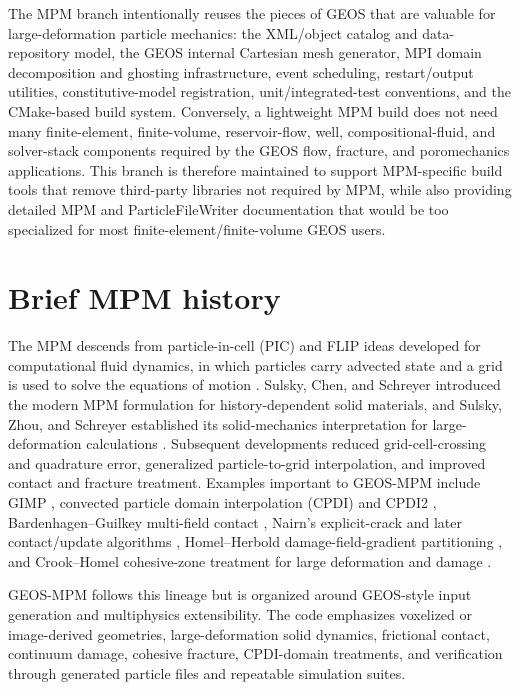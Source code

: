 The MPM branch intentionally reuses the pieces of GEOS that are valuable for large-deformation particle mechanics: the XML/object catalog and data-repository model, the GEOS internal Cartesian mesh generator, MPI domain decomposition and ghosting infrastructure, event scheduling, restart/output utilities, constitutive-model registration, unit/integrated-test conventions, and the CMake-based build system.  Conversely, a lightweight MPM build does not need many finite-element, finite-volume, reservoir-flow, well, compositional-fluid, and solver-stack components required by the GEOS flow, fracture, and poromechanics applications.  This branch is therefore maintained to support MPM-specific build tools that remove third-party libraries not required by MPM, while also providing detailed MPM and ParticleFileWriter documentation that would be too specialized for most finite-element/finite-volume GEOS users.

\section*{Brief MPM history}
{}
The MPM descends from particle-in-cell (PIC) and FLIP ideas developed for computational fluid dynamics, in which particles carry advected state and a grid is used to solve the equations of motion \cite{harlow1964pic,brackbill1988flip}.  Sulsky, Chen, and Schreyer introduced the modern MPM formulation for history-dependent solid materials, and Sulsky, Zhou, and Schreyer established its solid-mechanics interpretation for large-deformation calculations \cite{sulsky1994history,sulsky1995solid}.  Subsequent developments reduced grid-cell-crossing and quadrature error, generalized particle-to-grid interpolation, and improved contact and fracture treatment.  Examples important to GEOS-MPM include GIMP \cite{bardenhagen2004gimp}, convected particle domain interpolation (CPDI) and CPDI2 \cite{sadeghirad2011cpdi,sadeghirad2013cpdi2}, Bardenhagen--Guilkey multi-field contact \cite{bardenhagen2001contact}, Nairn's explicit-crack and later contact/update algorithms \cite{nairn2003cramp,nairn2020contact}, Homel--Herbold damage-field-gradient partitioning \cite{homel2016dfg}, and Crook--Homel cohesive-zone treatment for large deformation and damage \cite{crook2025cohesive}.

GEOS-MPM follows this lineage but is organized around GEOS-style input generation and multiphysics extensibility.  The code emphasizes voxelized or image-derived geometries, large-deformation solid dynamics, frictional contact, continuum damage, cohesive fracture, CPDI-domain treatments, and verification through generated particle files and repeatable simulation suites.

